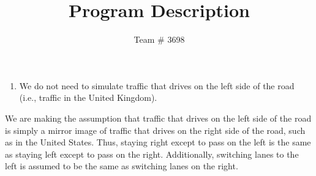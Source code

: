 \documentclass[letterpaper,12pt]{article}
\author{Team \# 3698}
\title{Program Description}
\begin{document}
\begin{enumerate}
	\item We do not need to simulate traffic that drives on the left side of the road (i.e., traffic in the United Kingdom).
\end{enumerate}
	
	We are making the assumption that traffic that drives on the left side of the road is simply a mirror image of traffic that drives on the right side of the road, such as in the United States. Thus, staying right except to pass on the left is the same as staying left except to pass on the right. Additionally, switching lanes to the left is assumed to be the same as switching lanes on the right.
	
\end{document}
